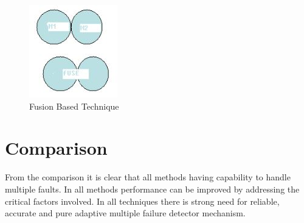 \documentclass{article}
\begin{document}
\begin{figure}[ht]
\centering
\includegraphics{../figz/fault}
\caption{Fusion Based Technique}
\label{fig:3}
\end{figure}

\section{Comparison}
From the comparison it is clear that all methods having capability to handle multiple faults. In all methods performance can be improved by addressing the critical factors involved. In all techniques there is strong need for reliable, accurate and pure adaptive multiple failure detector mechanism. 
\end{document}
